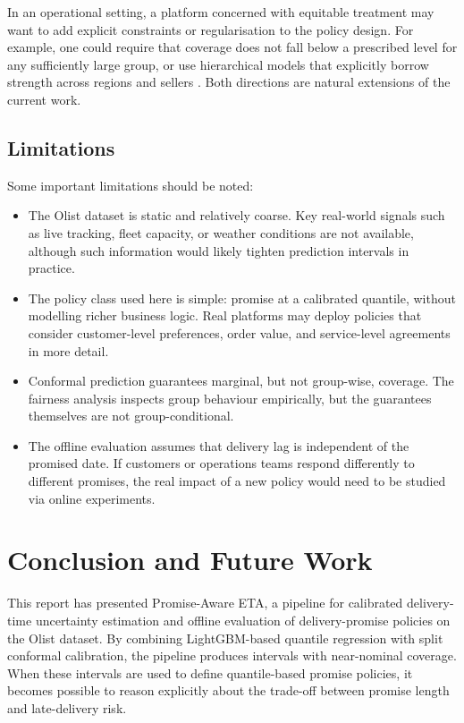 \documentclass[12pt]{article}
\begin{document}
In an operational setting, a platform concerned with equitable treatment may want to add explicit constraints or regularisation to the policy design. For example, one could require that coverage does not fall below a prescribed level for any sufficiently large group, or use hierarchical models that explicitly borrow strength across regions and sellers \citep{pleiss2017fairness,pfohl2021fairrisk}. Both directions are natural extensions of the current work.

\subsection{Limitations}
Some important limitations should be noted:
\begin{itemize}
  \item The Olist dataset is static and relatively coarse. Key real-world signals such as live tracking, fleet capacity, or weather conditions are not available, although such information would likely tighten prediction intervals in practice.
  \item The policy class used here is simple: promise at a calibrated quantile, without modelling richer business logic. Real platforms may deploy policies that consider customer-level preferences, order value, and service-level agreements in more detail.
  \item Conformal prediction guarantees marginal, but not group-wise, coverage. The fairness analysis inspects group behaviour empirically, but the guarantees themselves are not group-conditional.
  \item The offline evaluation assumes that delivery lag is independent of the promised date. If customers or operations teams respond differently to different promises, the real impact of a new policy would need to be studied via online experiments.
\end{itemize}

\section{Conclusion and Future Work}
This report has presented Promise-Aware ETA, a pipeline for calibrated delivery-time uncertainty estimation and offline evaluation of delivery-promise policies on the Olist dataset. By combining LightGBM-based quantile regression with split conformal calibration, the pipeline produces intervals with near-nominal coverage. When these intervals are used to define quantile-based promise policies, it becomes possible to reason explicitly about the trade-off between promise length and late-delivery risk.
\end{document}
